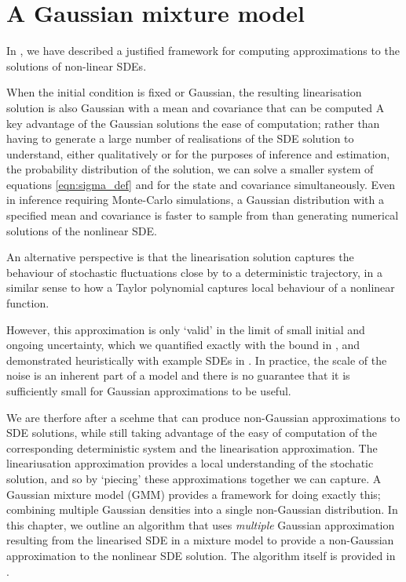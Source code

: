 \chapter{A Gaussian mixture model}\label{ch:gmm}
In , we have described a justified framework for computing approximations to the solutions of non-linear SDEs.

When the initial condition is fixed or Gaussian, the resulting linearisation solution is also Gaussian with a mean and covariance that can be computed
A key advantage of the Gaussian solutions the ease of computation; rather than having to generate a large number of realisations of the SDE solution to understand, either qualitatively or for the purposes of inference and estimation, the probability distribution of the solution, we can solve a smaller system of equations \cref{eqn:sigma_def} and for the state and covariance simultaneously.
Even in inference requiring Monte-Carlo simulations, a Gaussian distribution with a specified mean and covariance is faster to sample from than generating numerical solutions of the nonlinear SDE.

An alternative perspective is that the linearisation solution captures the behaviour of stochastic fluctuations close by to a deterministic trajectory, in a similar sense to how a Taylor polynomial captures local behaviour of a nonlinear function.

However, this approximation is only `valid' in the limit of small initial and ongoing uncertainty, which we quantified exactly with the bound in , and demonstrated heuristically with example SDEs in .
In practice, the scale of the noise is an inherent part of a model and there is no guarantee that it is sufficiently small for Gaussian approximations to be useful.

We are therfore after a scehme that can produce non-Gaussian approximations to SDE solutions, while still taking advantage of the easy of computation of the corresponding deterministic system and the linearisation approximation.
The lineariusation approximation provides a local understanding of the stochatic solution, and so by `piecing' these approximations together we can capture.
A Gaussian mixture model (GMM) provides a framework for doing exactly this; combining multiple Gaussian densities into a single non-Gaussian distribution.
In this chapter, we outline an algorithm that uses \emph{multiple} Gaussian approximation resulting from the linearised SDE in a mixture model to provide a non-Gaussian approximation to the nonlinear SDE solution.
The algorithm itself is provided in .

